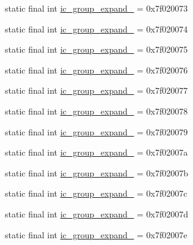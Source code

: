 \begin{CompactItemize}
\item 
static final int \hyperlink{classandroid_1_1support_1_1graphics_1_1drawable_1_1animated_1_1_r_1_1drawable_c9538e5d87807052cb19a491da555818}{ic\_\-group\_\-expand\_} = 0x7f020073
\item 
static final int \hyperlink{classandroid_1_1support_1_1graphics_1_1drawable_1_1animated_1_1_r_1_1drawable_e986a5e0af91de948754ba060be43cc5}{ic\_\-group\_\-expand\_} = 0x7f020074
\item 
static final int \hyperlink{classandroid_1_1support_1_1graphics_1_1drawable_1_1animated_1_1_r_1_1drawable_b3a3bbfb28e210cd3e3079a8be72d11c}{ic\_\-group\_\-expand\_} = 0x7f020075
\item 
static final int \hyperlink{classandroid_1_1support_1_1graphics_1_1drawable_1_1animated_1_1_r_1_1drawable_2c28866e0e1de30fa34759612317a400}{ic\_\-group\_\-expand\_} = 0x7f020076
\item 
static final int \hyperlink{classandroid_1_1support_1_1graphics_1_1drawable_1_1animated_1_1_r_1_1drawable_2cbc02b141e505fb49a82c50186371e8}{ic\_\-group\_\-expand\_} = 0x7f020077
\item 
static final int \hyperlink{classandroid_1_1support_1_1graphics_1_1drawable_1_1animated_1_1_r_1_1drawable_7458bfba43430f52470c459417c92352}{ic\_\-group\_\-expand\_} = 0x7f020078
\item 
static final int \hyperlink{classandroid_1_1support_1_1graphics_1_1drawable_1_1animated_1_1_r_1_1drawable_1eee65a95adfc36d8c2287ea8aed684d}{ic\_\-group\_\-expand\_} = 0x7f020079
\item 
static final int \hyperlink{classandroid_1_1support_1_1graphics_1_1drawable_1_1animated_1_1_r_1_1drawable_d63e2b34d569c4db85f8f864d28c48c2}{ic\_\-group\_\-expand\_} = 0x7f02007a
\item 
static final int \hyperlink{classandroid_1_1support_1_1graphics_1_1drawable_1_1animated_1_1_r_1_1drawable_75d35e0bd86f33631e58581b367e3e2a}{ic\_\-group\_\-expand\_} = 0x7f02007b
\item 
static final int \hyperlink{classandroid_1_1support_1_1graphics_1_1drawable_1_1animated_1_1_r_1_1drawable_4164677fd7e8dd52c14c8e45f47c142a}{ic\_\-group\_\-expand\_} = 0x7f02007c
\item 
static final int \hyperlink{classandroid_1_1support_1_1graphics_1_1drawable_1_1animated_1_1_r_1_1drawable_feef6c709f3be287261b7b5ca452e023}{ic\_\-group\_\-expand\_} = 0x7f02007d
\item 
static final int \hyperlink{classandroid_1_1support_1_1graphics_1_1drawable_1_1animated_1_1_r_1_1drawable_88222b7ddd51d55e7616d292ba663978}{ic\_\-group\_\-expand\_} = 0x7f02007e

\end{CompactItemize}
